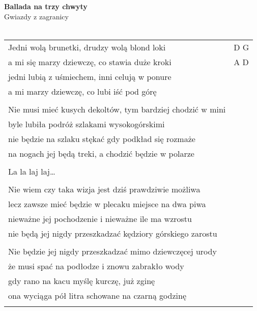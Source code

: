 \documentclass[a5paper]{article}
\begin{document}


\noindent
\fontsize{12pt}{15pt}\selectfont
\textbf{Ballada na trzy chwyty} \\
\fontsize{8pt}{10pt}\selectfont
Gwiazdy z zagranicy \\ \\
\fontsize{10pt}{12pt}\selectfont
{}
\begin{tabular}{@{}p{9.5cm}p{3cm}@{}}
\noindent

Jedni wolą brunetki, drudzy wolą blond loki & D G \\
a mi się marzy dziewczę, co stawia duże kroki & A D \\
jedni lubią z uśmiechem, inni celują w ponure \\
a mi marzy dziewczę, co lubi iść pod górę \\ \\

Nie musi mieć kusych dekoltów, tym bardziej chodzić w mini \\
byle lubiła podróż szlakami wysokogórskimi \\
nie będzie na szlaku stękać gdy podkład się rozmaże \\
na nogach jej będą treki, a chodzić będzie w polarze \\ \\

\hspace{1cm}La la laj laj… \\ \\

Nie wiem czy taka wizja jest dziś prawdziwie możliwa \\ 
lecz zawsze mieć będzie w plecaku miejsce na dwa piwa \\
nieważne jej pochodzenie i nieważne ile ma wzrostu \\
nie będą jej nigdy przeszkadzać kędziory górskiego zarostu \\ \\

Nie będzie jej nigdy przeszkadzać mimo dziewczęcej urody \\
że musi spać na podłodze i znowu zabrakło wody \\
gdy rano na kacu myślę kurczę, już zginę \\
ona wyciąga pół litra schowane na czarną godzinę \\ \\


\end{tabular}
\end{document}
